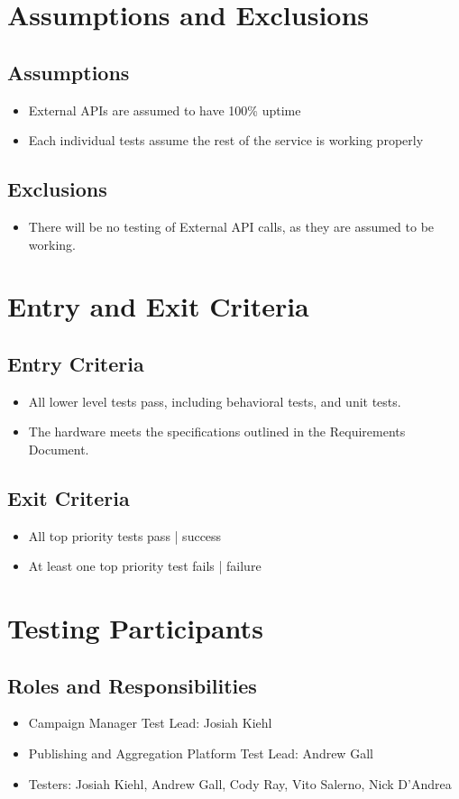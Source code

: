 \documentclass[12pt]{article}
\begin{document}
\section{Assumptions and Exclusions}
\subsection{Assumptions}
\begin{itemize}
\item External APIs are assumed to have 100\% uptime
\item Each individual tests assume the rest of the service is working properly
\end{itemize}
\subsection{Exclusions}
\begin{itemize}
\item There will be no testing of External API calls, as they are assumed to be working.
\end{itemize}
\section{Entry and Exit Criteria}
\subsection{Entry Criteria}
\begin{itemize}
\item All lower level tests pass, including behavioral tests, and unit tests.
\item The hardware meets the specifications outlined in the Requirements Document.
\end{itemize}
\subsection{Exit Criteria}
\begin{itemize}
  \item All top priority tests pass | success
  \item At least one top priority test fails | failure
\end{itemize}

\section{Testing Participants}
\subsection{Roles and Responsibilities}
\begin{itemize}
\item Campaign Manager Test Lead: Josiah Kiehl
\item Publishing and Aggregation Platform Test Lead: Andrew Gall
\item Testers: Josiah Kiehl, Andrew Gall, Cody Ray, Vito Salerno, Nick D'Andrea
\end{itemize}
\end{document}
